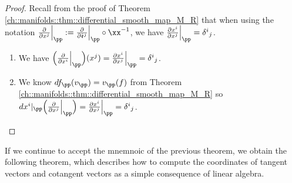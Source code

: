 \begin{proof}
    Recall from the proof of Theorem \ref{ch::manifolds::thm::differential_smooth_map_M_R} that when using the notation $\frac{\pd}{\pd x^j}\Big|_\pp := \frac{\pd}{\pd \see^j}\Big|_\pp \circ \xx^{-1}$, we have $\frac{\pd x^i}{\pd x^j}\Big|_\pp = \delta^i{}_j$.
    
    \begin{enumerate}
        \item We have $\Big(\frac{\pd}{\pd x^i}\Big|_\pp\Big)(x^j) = \frac{\pd x^i}{\pd x^j}\Big|_\pp = \delta^i{}_j$.
        \item We know $df_\pp(v_\pp) = v_\pp(f)$ from Theorem \ref{ch::manifolds::thm::differential_smooth_map_M_R} so $dx^i|_\pp\Big(\frac{\pd}{\pd x^j}\Big|_\pp\Big) = \frac{\pd x^i}{\pd x^j}\Big|_\pp = \delta^i{}_j$. 
    \end{enumerate}
\end{proof}

If we continue to accept the mnemnoic of the previous theorem, we obtain the following theorem, which describes how to compute the coordinates of tangent vectors and cotangent vectors as a simple consequence of linear algebra.

